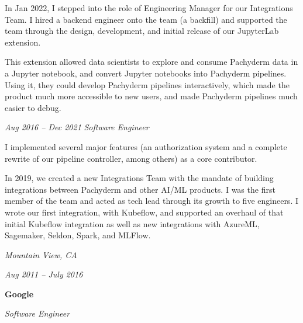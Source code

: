 \documentclass[10pt, letterpaper]{article}
\begin{document}
\vspace{0.10 cm}

\begin{onecolentry}
    \begin{highlights}
        \item In Jan 2022, I stepped into the role of Engineering Manager for our Integrations Team. I hired a backend engineer onto the team (a backfill) and supported the team through the design, development, and initial release of our JupyterLab extension.
        \item This extension allowed data scientists to explore and consume Pachyderm data in a Jupyter notebook, and convert Jupyter notebooks into Pachyderm pipelines. Using it, they could develop Pachyderm pipelines interactively, which made the product much more accessible to new users, and made Pachyderm pipelines much easier to debug.
    \end{highlights}
\end{onecolentry}

\vspace{0.2 cm}

\begin{twocolentry}{
    \textit{Aug 2016 – Dec 2021}
}
    \textit{Software Engineer}
\end{twocolentry}

\vspace{0.10 cm}

\begin{onecolentry}
    \begin{highlights}
        \item I implemented several major features (an authorization system and a complete rewrite of our pipeline controller, among others) as a core contributor.
        \item In 2019, we created a new Integrations Team with the mandate of building integrations between Pachyderm and other AI/ML products. I was the first member of the team and acted as tech lead through its growth to five engineers. I wrote our first integration, with Kubeflow, and supported an overhaul of that initial Kubeflow integration as well as new integrations with AzureML, Sagemaker, Seldon, Spark, and MLFlow.
    \end{highlights}
  \end{onecolentry}

\vspace{0.2 cm}

\begin{twocolentry}{
    \textit{Mountain View, CA}

    \textit{Aug 2011 – July 2016}
}
    \textbf{Google}

    \textit{Software Engineer}
\end{twocolentry}
\end{document}
